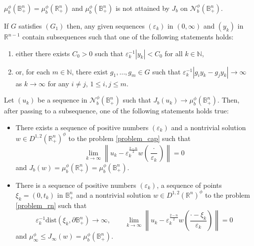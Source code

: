 \documentclass[10pt,a4paper]{amsart}
\def\D{\mathbb{B}^n_+}
\def\cN{\mathcal{N}}
\def\dist{\mathrm{dist}}
\def\eps{\varepsilon}
\def\hn{\mathbb{R}^n_+}
\def\n{\mathbb{N}}
\def\rn{\mathbb{R}^n}
\def\r{\mathbb{R}}
\begin{document}
\begin{lemma} \label{lem:no_minimum}
$\mu^\phi_b(\D)=\mu^\phi_b(\hn)$ and $\mu^\phi_b(\D)$ is not attained by $J_b$ on $\cN_b^\phi(\D)$.
\end{lemma}

\begin{lemma}\label{lem:G}
If $G$ satisfies $(G_1)$ then, any given sequences $(\eps_k)$ in $(0,\infty)$ and $(y_k)$ in $\r^{n-1}$ contain subsequences such that one of the following statements holds:
\begin{enumerate}
\item[$(i)$] either there exists $C_0>0$ such that $\eps_{k}^{-1}|y_k|<C_0$ for all $k\in\n$,
\item[$(ii)$] or, for each $m\in\n$, there exist $g_1,\ldots,g_m\in G$ such that $\eps_{k}^{-1}|g_iy_k-g_jy_k|\to\infty$ as $k\to\infty$ for any $i\neq j$, $1\leq i,j\leq m$.
\end{enumerate}
\end{lemma}

\begin{theorem} \label{thm:minimizing}
Let $(u_k)$ be a sequence in $\cN_b^\phi(\D)$ such that $J_b(u_k)\to \mu^\phi_b(\D)$. Then, after passing to a subsequence, one of the following statements holds true:
\begin{itemize}
\item[$(I)$] There exists a sequence of positive numbers $(\eps_k)$ and a nontrivial solution $w\in D^{1,2}(\hn)^\phi$ to the problem \eqref{problem_cap} such that
$$\lim_{k\to\infty}\left\|u_k-\eps_k^\frac{2-n}{2}w\left(\frac{\cdot}{\eps_k}\right)\right\| = 0$$
and $J_b(w)=\mu^\phi_b(\hn)=\mu^\phi_b(\D)$.

\item[$(II)$] There is a sequence of positive numbers $(\eps_k)$, a sequence of points $\xi_k=(0,t_k)$ in $\D$ and a nontrivial solution $w\in D^{1,2}(\rn)^\phi$ to the problem \eqref{problem_rn} such that
$$\eps_k^{-1}\dist(\xi_k,\partial\D)\to\infty,\qquad\lim_{k\to\infty}\left\|u_k-\eps_k^\frac{2-n}{2}w\left(\frac{\cdot - \xi_k}{\eps_k}\right)\right\| = 0$$
and $\mu^\phi_\infty\leq J_\infty(w)=\mu^\phi_b(\D)$.
\end{itemize}
\end{theorem}
\end{document}
